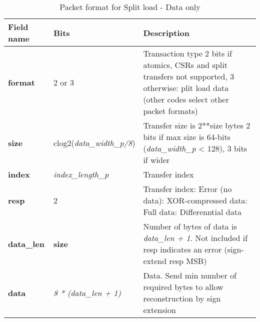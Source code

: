 \begin{table}[htp]
  \centering
  \caption{Packet format for Split load - Data only}
  \label{tab:te_datadx0y4}
  \begin{tabulary}{\textwidth}{|l|p{40mm}|p{90mm}|}
    \hline
    {\bf Field name} & {\bf Bits} & {\bf Description} \\
    \hline
    \textbf{format} & 	2 or 3	& Transaction type	2 bits if atomics, CSRs and split transfers not supported, 3 otherwise: plit load data\newline	
		(other codes select other packet formats)\\
    \hline
    \textbf{size} & clog2(\textit{data\_width\_p/8}) & Transfer size is 2**size bytes	2 bits if max size is 64-bits (\textit{data\_width\_p} < 128), 3 bits if wider \\
    \hline
    \textbf{index} & \textit{index\_length\_p} & Transfer index\\
    \hline
    \textbf{resp} & 	2	& Transfer index: Error (no data): XOR-compressed data: Full data: Differenntial data\\
   \textbf{data\_len}	& \textbf{size} & Number of bytes of data is \textit {data\_len + 1}. Not included if resp indicates an error (sign-extend resp MSB)\\
    \hline
    \textbf{data} & \textit {8 * (data\_len + 1)} & 
                Data. Send min number of required bytes to allow reconstruction by sign extension\\
    \hline
  \end{tabulary}
\end{table}



